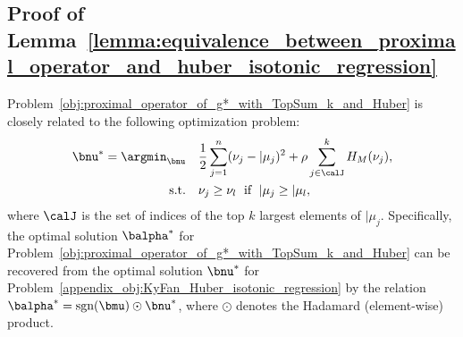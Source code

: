 \subsection{Proof of Lemma~\ref{lemma:equivalence_between_proximal_operator_and_huber_isotonic_regression}}
\label{appendix_subsec:proof_equivalence_between_proximal_operator_and_huber_isotonic_regression}

\begin{namedlemma}[~\ref{lemma:equivalence_between_proximal_operator_and_huber_isotonic_regression}]
    \label{appendix_lemma:equivalence_between_proximal_operator_and_huber_isotonic_regression}
    Problem~\eqref{obj:proximal_operator_of_g*_with_TopSum_k_and_Huber} is closely related to the following optimization problem:
    \begin{align}
        \label{appendix_obj:KyFan_Huber_isotonic_regression}
        \bnu^* = \argmin_{\bnu} & \quad \frac{1}{2} \sum_{j=1}^n (\nu_j - \vert{\mu_j})^2 + \rho \sum_{j \in \calJ}^k H_M (\nu_j), \\
        \text{s.t.} & \quad \nu_j \geq \nu_l \; \text{ if } \; \vert{\mu_j} \geq \vert{\mu_l}, \nonumber
    \end{align}
    where $\calJ$ is the set of indices of the top $k$ largest elements of $ \vert{\mu_j}$.
    Specifically, the optimal solution $\balpha^*$ for Problem~\eqref{obj:proximal_operator_of_g*_with_TopSum_k_and_Huber} can be recovered from the optimal solution $\bnu^*$ for Problem~\eqref{appendix_obj:KyFan_Huber_isotonic_regression} by the relation $\balpha^* = \text{sgn}(\bmu) \odot \bnu^*$, where $\odot$ denotes the Hadamard (element-wise) product.
\end{namedlemma}

